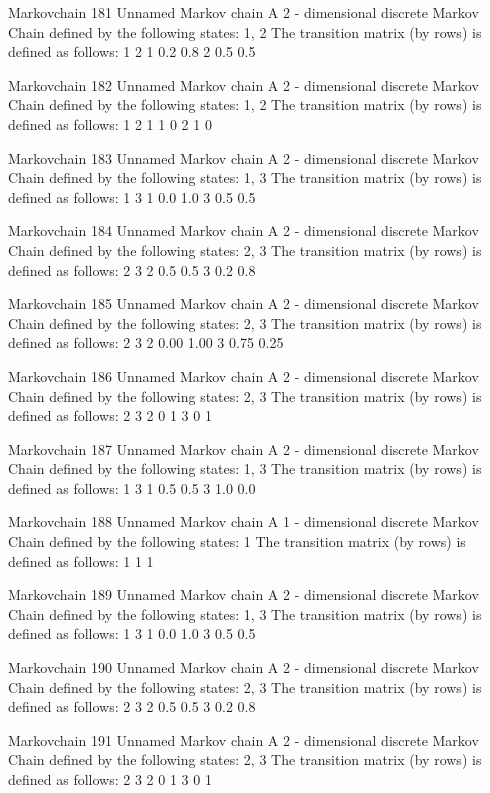 \documentclass[
  nojss]{jss}
\begin{document}
\begin{CodeChunk}
\begin{CodeOutput}
Markovchain  181 
Unnamed Markov chain 
 A  2 - dimensional discrete Markov Chain defined by the following states: 
 1, 2 
 The transition matrix  (by rows)  is defined as follows: 
    1   2
1 0.2 0.8
2 0.5 0.5

Markovchain  182 
Unnamed Markov chain 
 A  2 - dimensional discrete Markov Chain defined by the following states: 
 1, 2 
 The transition matrix  (by rows)  is defined as follows: 
  1 2
1 1 0
2 1 0

Markovchain  183 
Unnamed Markov chain 
 A  2 - dimensional discrete Markov Chain defined by the following states: 
 1, 3 
 The transition matrix  (by rows)  is defined as follows: 
    1   3
1 0.0 1.0
3 0.5 0.5

Markovchain  184 
Unnamed Markov chain 
 A  2 - dimensional discrete Markov Chain defined by the following states: 
 2, 3 
 The transition matrix  (by rows)  is defined as follows: 
    2   3
2 0.5 0.5
3 0.2 0.8

Markovchain  185 
Unnamed Markov chain 
 A  2 - dimensional discrete Markov Chain defined by the following states: 
 2, 3 
 The transition matrix  (by rows)  is defined as follows: 
     2    3
2 0.00 1.00
3 0.75 0.25

Markovchain  186 
Unnamed Markov chain 
 A  2 - dimensional discrete Markov Chain defined by the following states: 
 2, 3 
 The transition matrix  (by rows)  is defined as follows: 
  2 3
2 0 1
3 0 1

Markovchain  187 
Unnamed Markov chain 
 A  2 - dimensional discrete Markov Chain defined by the following states: 
 1, 3 
 The transition matrix  (by rows)  is defined as follows: 
    1   3
1 0.5 0.5
3 1.0 0.0

Markovchain  188 
Unnamed Markov chain 
 A  1 - dimensional discrete Markov Chain defined by the following states: 
 1 
 The transition matrix  (by rows)  is defined as follows: 
  1
1 1

Markovchain  189 
Unnamed Markov chain 
 A  2 - dimensional discrete Markov Chain defined by the following states: 
 1, 3 
 The transition matrix  (by rows)  is defined as follows: 
    1   3
1 0.0 1.0
3 0.5 0.5

Markovchain  190 
Unnamed Markov chain 
 A  2 - dimensional discrete Markov Chain defined by the following states: 
 2, 3 
 The transition matrix  (by rows)  is defined as follows: 
    2   3
2 0.5 0.5
3 0.2 0.8

Markovchain  191 
Unnamed Markov chain 
 A  2 - dimensional discrete Markov Chain defined by the following states: 
 2, 3 
 The transition matrix  (by rows)  is defined as follows: 
  2 3
2 0 1
3 0 1


\end{CodeOutput}
\end{CodeChunk}
\end{document}
